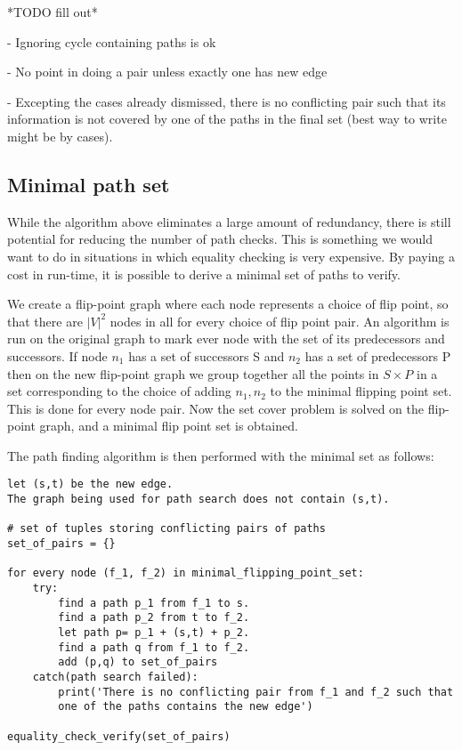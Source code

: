 \documentclass{article}
\begin{document}
*TODO fill out*

- Ignoring cycle containing paths is ok

- No point in doing a pair unless exactly one has new edge

- Excepting the cases already dismissed, there is no conflicting pair such that its information is not covered by one of the paths in the final set (best way to write might be by cases).

\subsection{Minimal path set}
While the algorithm above eliminates a large amount of redundancy, there is still potential for reducing the number of path checks. This is something we would want to do in situations in which equality checking is very expensive. By paying a cost in run-time, it is possible to derive a minimal set of paths to verify.

We create a flip-point graph where each node represents a choice of flip point, so that there are $|V|^2$ nodes in all for every choice of flip point pair.
An algorithm is run on the original graph to mark ever node with the set of its predecessors and successors.
If node $n_1$ has a set of successors S and $n_2$ has a set of predecessors P then on the new flip-point graph we group together all the points in $S\times P$ in a set corresponding to the choice of adding $n_1, n_2$ to the minimal flipping point set. This is done for every node pair.
Now the set cover problem is solved on the flip-point graph, and a minimal flip point set is obtained.

The path finding algorithm is then performed with the minimal set as follows:

\begin{verbatim}
let (s,t) be the new edge.
The graph being used for path search does not contain (s,t).

# set of tuples storing conflicting pairs of paths
set_of_pairs = {}

for every node (f_1, f_2) in minimal_flipping_point_set:
    try:
        find a path p_1 from f_1 to s.
        find a path p_2 from t to f_2.
        let path p= p_1 + (s,t) + p_2.
        find a path q from f_1 to f_2.
        add (p,q) to set_of_pairs    
    catch(path search failed):
        print('There is no conflicting pair from f_1 and f_2 such that
        one of the paths contains the new edge')

equality_check_verify(set_of_pairs)
            
\end{verbatim}
\end{document}
